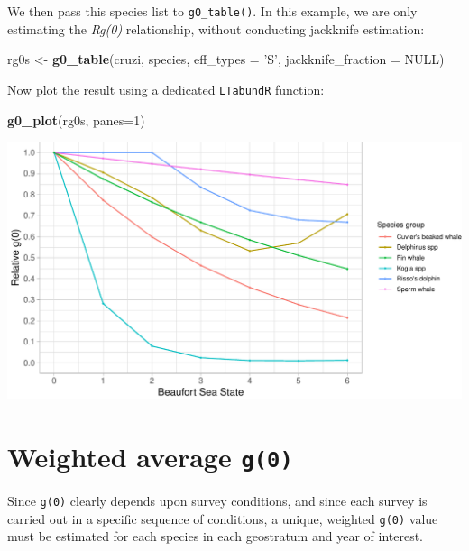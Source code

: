 \documentclass[
]{book}
\newenvironment{Shaded}{\begin{snugshade}}{\end{snugshade}}
\newcommand{\DataTypeTok}[1]{\textcolor[rgb]{0.13,0.29,0.53}{#1}}
\newcommand{\DecValTok}[1]{\textcolor[rgb]{0.00,0.00,0.81}{#1}}
\newcommand{\KeywordTok}[1]{\textcolor[rgb]{0.13,0.29,0.53}{\textbf{#1}}}
\newcommand{\NormalTok}[1]{#1}
\newcommand{\OtherTok}[1]{\textcolor[rgb]{0.56,0.35,0.01}{#1}}
\newcommand{\StringTok}[1]{\textcolor[rgb]{0.31,0.60,0.02}{#1}}
\begin{document}
We then pass this species list to \texttt{g0\_table()}. In this example, we are only estimating the \emph{Rg(0)} relationship, without conducting jackknife estimation:

\begin{Shaded}
\begin{Highlighting}[]
\NormalTok{rg0s <-}\StringTok{ }\KeywordTok{g0_table}\NormalTok{(cruzi,}
\NormalTok{               species,}
               \DataTypeTok{eff_types =} \StringTok{'S'}\NormalTok{,}
               \DataTypeTok{jackknife_fraction =} \OtherTok{NULL}\NormalTok{)}
\end{Highlighting}
\end{Shaded}

Now plot the result using a dedicated \texttt{LTabundR} function:

\begin{Shaded}
\begin{Highlighting}[]
\KeywordTok{g0_plot}\NormalTok{(rg0s, }\DataTypeTok{panes=}\DecValTok{1}\NormalTok{)}
\end{Highlighting}
\end{Shaded}

\includegraphics{figures/unnamed-chunk-149-1.pdf}

\hypertarget{weighted-average-g0}{%
\section*{\texorpdfstring{Weighted average \texttt{g(0)}}{Weighted average g(0)}}\label{weighted-average-g0}}

Since \texttt{g(0)} clearly depends upon survey conditions, and since each survey is carried out in a specific sequence of conditions, a unique, weighted \texttt{g(0)} value must be estimated for each species in each geostratum and year of interest.
\end{document}
